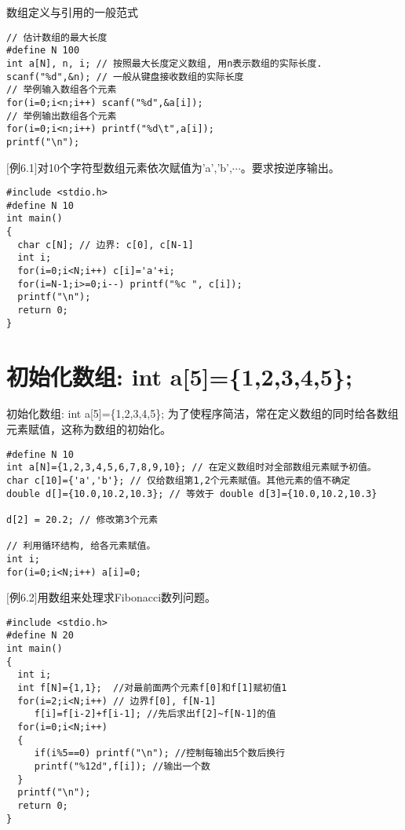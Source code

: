 \begin{frame}[fragile]{数组定义与引用的一般范式}
\begin{lstlisting}
// 估计数组的最大长度
#define N 100 
int a[N], n, i; // 按照最大长度定义数组, 用n表示数组的实际长度.
scanf("%d",&n); // 一般从键盘接收数组的实际长度
// 举例输入数组各个元素
for(i=0;i<n;i++) scanf("%d",&a[i]);
// 举例输出数组各个元素
for(i=0;i<n;i++) printf("%d\t",a[i]);
printf("\n");
\end{lstlisting}
\end{frame}

\begin{frame}
$[$例6.1$]$对10个字符型数组元素依次赋值为'a','b',$\cdots$。要求按逆序输出。
\pause
\begin{lstlisting}
#include <stdio.h>
#define N 10
int main()
{
  char c[N]; // 边界: c[0], c[N-1]
  int i;
  for(i=0;i<N;i++) c[i]='a'+i; 
  for(i=N-1;i>=0;i--) printf("%c ", c[i]);
  printf("\n");
  return 0;
}
\end{lstlisting}
\end{frame}

\section{初始化数组: int a[5]=\{1,2,3,4,5\};}

\begin{frame}{初始化数组: int a[5]=\{1,2,3,4,5\};}
为了使程序简洁，常在定义数组的同时给各数组元素赋值，这称为数组的初始化。
\begin{lstlisting}
#define N 10
int a[N]={1,2,3,4,5,6,7,8,9,10}; // 在定义数组时对全部数组元素赋予初值。
char c[10]={'a','b'}; // 仅给数组第1,2个元素赋值。其他元素的值不确定
double d[]={10.0,10.2,10.3}; // 等效于 double d[3]={10.0,10.2,10.3}

d[2] = 20.2; // 修改第3个元素

// 利用循环结构, 给各元素赋值。
int i;
for(i=0;i<N;i++) a[i]=0;
\end{lstlisting}
\end{frame}

\begin{frame}
$[$例6.2$]$用数组来处理求Fibonacci数列问题。
\begin{lstlisting}
#include <stdio.h>
#define N 20
int main()
{
  int i;
  int f[N]={1,1};  //对最前面两个元素f[0]和f[1]赋初值1
  for(i=2;i<N;i++) // 边界f[0], f[N-1]
     f[i]=f[i-2]+f[i-1]; //先后求出f[2]~f[N-1]的值
  for(i=0;i<N;i++)
  {
     if(i%5==0) printf("\n"); //控制每输出5个数后换行
     printf("%12d",f[i]); //输出一个数
  }
  printf("\n");
  return 0;
}
\end{lstlisting}
\end{frame}

